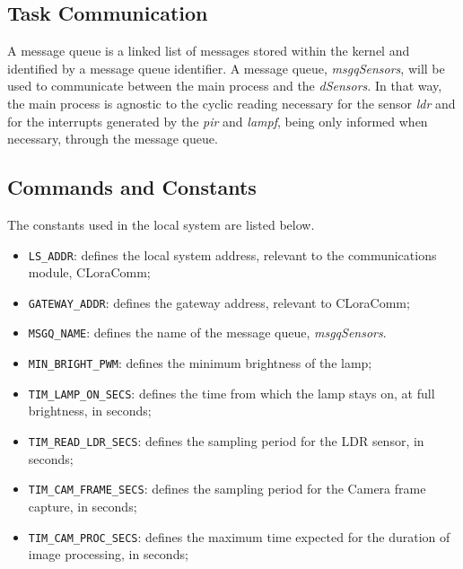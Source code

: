 \subsection{Task Communication}

A message queue is a linked list of messages stored within the kernel and identified by a message queue identifier. A message queue, \textit{msgqSensors}, will be used to communicate between the main process and the \textit{dSensors}. In that way, the main process is agnostic to the cyclic reading necessary for the sensor \textit{ldr} and for the interrupts generated by the \textit{pir} and \textit{lampf}, being only informed when necessary, through the message queue.

\subsection{Commands and Constants}

The constants used in the local system are listed below.
\begin{itemize}
	\item \verb|LS_ADDR|: defines the local system address, relevant to the communications module, CLoraComm;
	\item \verb|GATEWAY_ADDR|: defines the gateway address, relevant to CLoraComm;\\
	
	\item \verb|MSGQ_NAME|: defines the name of the message queue, \textit{msgqSensors}.
	\item \verb|MIN_BRIGHT_PWM|: defines the minimum brightness of the lamp;\\
	
	\item \verb|TIM_LAMP_ON_SECS|: defines the time from which the lamp stays on, at full brightness, in seconds;	
	\item \verb|TIM_READ_LDR_SECS|: defines the sampling period for the LDR sensor, in seconds;
	\item \verb|TIM_CAM_FRAME_SECS|: defines the sampling period for the Camera frame capture, in seconds;
	\item \verb|TIM_CAM_PROC_SECS|: defines the maximum time expected for the duration of image processing, in seconds;
	
\end{itemize}

